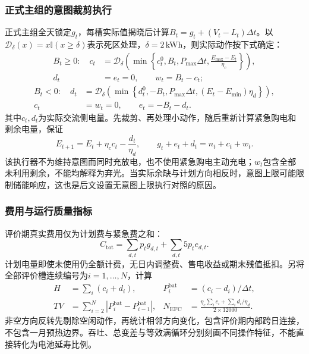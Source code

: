 \subsubsection{正式主组的意图裁剪执行}

正式主组全天锁定$g_t$，每槽实际值揭晓后计算$B_t=g_t+(V_t-L_t)\Delta t$。以$\mathcal D_\delta(x)=x\mathbb I(x\ge\delta)$表示死区处理，$\delta=2$\,kWh，则实际动作按下式确定：
\begin{equation}\label{eq:q2-execute-charge}
 \begin{aligned}
 B_t\ge0:\quad c_t&=\mathcal D_\delta\!\left(\min\left\{c_t^0,B_t,
 P_{\max}\Delta t,\frac{E_{\max}-E_t}{\eta_c}\right\}\right),\\
 d_t&=e_t=0,\qquad w_t=B_t-c_t;
 \end{aligned}
\end{equation}
\begin{equation}\label{eq:q2-execute-discharge}
 \begin{aligned}
 B_t<0:\quad d_t&=\mathcal D_\delta\!\left(\min\left\{d_t^0,-B_t,
 P_{\max}\Delta t,(E_t-E_{\min})\eta_d\right\}\right),\\
 c_t&=w_t=0,\qquad e_t=-B_t-d_t.
 \end{aligned}
\end{equation}
其中$c_t,d_t$为实际交流侧电量。先裁剪、再处理小动作，随后重新计算紧急购电和剩余电量，保证
\begin{equation}\label{eq:q2-balance}
 E_{t+1}=E_t+\eta_c c_t-\frac{d_t}{\eta_d},\qquad
 g_t+e_t+d_t=n_t+c_t+w_t.
\end{equation}
该执行器不为维持意图而同时充放电，也不使用紧急购电主动充电；$w_t$包含全部未利用剩余，不能均解释为弃光。当实际余缺与计划方向相反时，意图上限可能限制储能响应，这也是后文设置无意图上限执行对照的原因。

\subsubsection{费用与运行质量指标}

评价期真实费用仅为计划费与紧急费之和：
\begin{equation}\label{eq:q2-real-cost}
 C_{\mathrm{tot}}=\sum_{d,t}p_tg_{d,t}+\sum_{d,t}5p_te_{d,t}.
\end{equation}
计划电量即使未使用仍全额计费，无日内调整费、售电收益或期末残值抵扣。另将全部评价槽连续编号为$i=1,\ldots,N$，计算
\begin{equation}\label{eq:q2-metrics}
 \begin{aligned}
 H&=\sum_i(c_i+d_i),& P_i^{\mathrm{bat}}&=(c_i-d_i)/\Delta t,\\
 TV&=\sum_{i=2}^{N}|P_i^{\mathrm{bat}}-P_{i-1}^{\mathrm{bat}}|,&
 N_{\mathrm{EFC}}&=\frac{\eta_c\sum_i c_i+\sum_i d_i/\eta_d}{2\times12000}.
 \end{aligned}
\end{equation}
非空方向反转先剔除空闲动作，再统计相邻方向变化，包含评价期内部跨日连接，不包含一月预热边界。吞吐、总变差与等效满循环分别刻画不同操作特征，不能直接转化为电池延寿比例。

